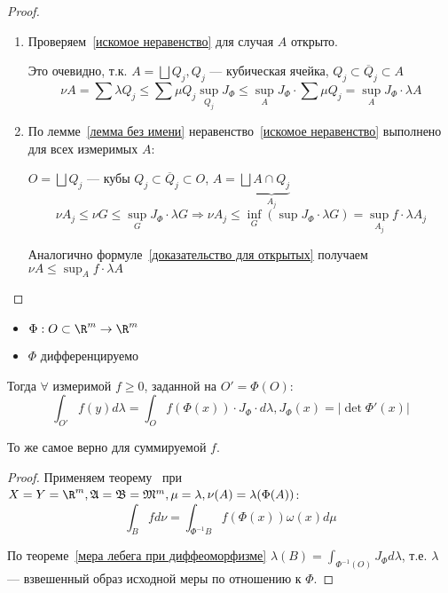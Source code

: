 \begin{proof}
\begin{enumerate}
        \item Проверяем~\eqref{искомое неравенство} для случая \(A\) открыто.

              Это очевидно, т.к. \(A = \bigsqcup Q_j, Q_j\) --- кубическая ячейка, \(Q_j \subset \overline Q_j \subset A\)
              \begin{equation}
                  \nu A = \sum \lambda Q_j \leq \sum \mu Q_j \sup_{Q_j} J_\Phi \leq \sup_A J_\Phi \cdot \sum \mu Q_j = \sup_A J_\Phi \cdot \lambda A \label{доказательство для открытых}
              \end{equation}

        \item По лемме~\ref{лемма без имени} неравенство~\eqref{искомое неравенство} выполнено для всех измеримых \(A\):

              \(O = \bigsqcup Q_j\) --- кубы \(Q_j \subset \overline Q_j \subset O\), \(A = \bigsqcup \underbrace{A \cap Q_j}_{A_j}\)
              \[\nu A_j \leq \nu G \leq \sup_G J_\Phi \cdot \lambda G \Rightarrow \nu A_j \leq \inf_G (\sup J_\Phi \cdot \lambda G) = \sup_{A_j} f \cdot \lambda A_j\]

              Аналогично формуле~\eqref{доказательство для открытых} получаем \(\nu A \leq \sup_A f \cdot \lambda A\)
    \end{enumerate}
\end{proof}

\begin{theorem}\itemfix
    \begin{itemize}
        \item \(\Phi : O \subset \R^m \to \R^m\)
        \item \(\Phi\) дифференцируемо
    \end{itemize}

    Тогда \(\forall\) измеримой \(f \geq 0\), заданной на \(O' = \Phi(O)\):
    \[\int_{O'} f(y)d\lambda = \int_O f(\Phi(x)) \cdot J_\Phi \cdot d \lambda, J_\Phi(x) = |\det \Phi'(x)|\]

    То же самое верно для суммируемой \(f\).
\end{theorem}
\begin{proof}
    Применяем теорему~ при \(X = Y = \R^m, \mathfrak{A} = \mathfrak{B} = \mathfrak{M}^m, \mu = \lambda, \nu(A) = \lambda(\Phi(A))\):
    \[\int_B f d\nu = \int_{\Phi^{-1}B} f(\Phi(x)) \omega(x) d\mu\]

    По теореме~\ref{мера лебега при диффеоморфизме} \(\lambda(B) = \int_{\Phi^{-1}(O)} J_\Phi d \lambda\), т.е. \(\lambda\) --- взвешенный образ исходной меры по отношению к \(\Phi\).
\end{proof}


